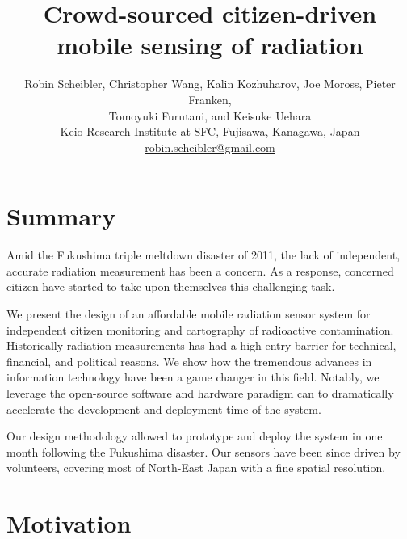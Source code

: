 \documentclass[11pt]{article}
\newcommand*{\TitleFont}{%
  \Large\usefont{T1}{phv}{b}{n}%
    \selectfont}
\newcommand*{\AuthorFont}{%
  \normalsize\usefont{T1}{\rmdefault}{m}{n}%
    \selectfont}
\begin{document}
%
\title{\TitleFont Crowd-sourced citizen-driven mobile sensing of radiation}



\author{
  \AuthorFont Robin Scheibler, Christopher Wang, Kalin Kozhuharov, Joe Moross, Pieter Franken, \\
  \AuthorFont Tomoyuki Furutani, and Keisuke Uehara \\
  \AuthorFont Keio Research Institute at SFC, Fujisawa, Kanagawa, Japan \\
  \AuthorFont \url{robin.scheibler@gmail.com}
}

\date{}

\maketitle

\thispagestyle{empty}
\pagestyle{empty}

\section*{Summary}
\label{sec:abstract}

Amid the Fukushima triple meltdown disaster of 2011, the lack of independent,
accurate radiation measurement has been a concern. As a response, concerned
citizen have started to take upon themselves this challenging task.

We present the design of an affordable mobile radiation sensor system for
independent citizen monitoring and cartography of radioactive contamination.
Historically radiation measurements has had a high entry barrier for technical,
financial, and political reasons. We show how the tremendous advances in
information technology have been a game changer in this field. Notably, we
leverage the open-source software and hardware paradigm can to dramatically
accelerate the development and deployment time of the system.

Our design methodology allowed to prototype and deploy the system in one
month following the Fukushima disaster. Our sensors have been since driven by
volunteers, covering most of North-East Japan with a fine spatial resolution.

\section*{Motivation}
\label{sec:motivation}
\end{document}
